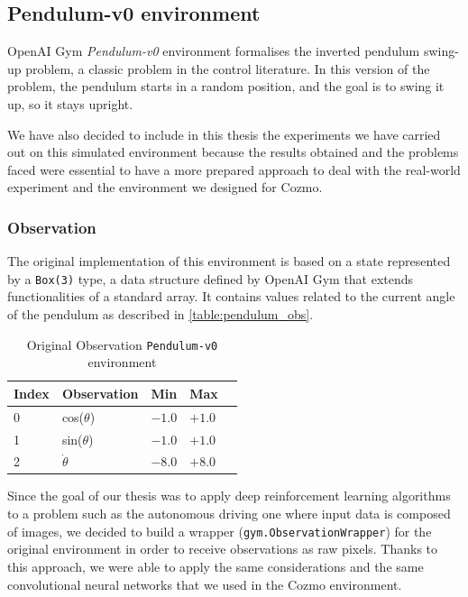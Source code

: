 \subsection{Pendulum-v0 environment}

OpenAI Gym \textit{Pendulum-v0} environment formalises the inverted pendulum swing-up problem, a classic problem in the control literature.
In this version of the problem, the pendulum starts in a random position, and the goal is to swing it up, so it stays upright.

We have also decided to include in this thesis the experiments we have carried out on this simulated environment because the results obtained and the problems faced were essential to have a more prepared approach to deal with the real-world experiment and the environment we designed for Cozmo.


\subsubsection{Observation}

The original implementation of this environment is based on a state represented by a \texttt{Box(3)} type, a data structure defined by OpenAI Gym that extends functionalities of a standard array.
It contains values related to the current angle of the pendulum as described in \vref{table:pendulum_obs}.

\begin{table}[!h]
	\centering
	\caption{Original Observation \texttt{Pendulum-v0} environment}
	\label{table:pendulum_obs}
	\begin{tabular}{@{}lllll@{}}
		\toprule
		Index & Observation    & Min    & Max    \\ \midrule
		0     & cos($\theta$)  & $-1.0$ & $+1.0$ \\
		1     & sin($\theta$)  & $-1.0$ & $+1.0$ \\
		2     & $\dot{\theta}$ & $-8.0$ & $+8.0$ \\
		\bottomrule
	\end{tabular}
\end{table}

Since the goal of our thesis was to apply deep reinforcement learning algorithms to a problem such as the autonomous driving one where input data is composed of images, we decided to build a wrapper (\texttt{gym.ObservationWrapper}) for the original environment in order to receive observations as raw pixels.
Thanks to this approach, we were able to apply the same considerations and the same convolutional neural networks that we used in the Cozmo environment.

